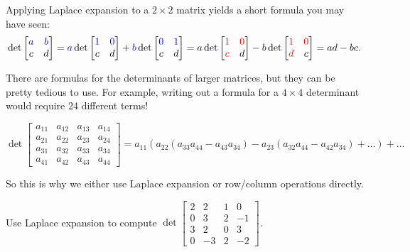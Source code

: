 \begin{observation}
Applying Laplace expansion to a \(2 \times 2\) matrix yields a short formula you may have seen:
\[
  \det \begin{bmatrix} \textcolor{blue}{a} & \textcolor{blue}{b} \\ c & d \end{bmatrix}
=
  \textcolor{blue}{a}\det \begin{bmatrix} \textcolor{blue}{1} & \textcolor{blue}{0} \\ 
    c & d \end{bmatrix} 
+ 
  \textcolor{blue}{b} \det \begin{bmatrix} \textcolor{blue}{0} & \textcolor{blue}{1} \\ 
    c & d \end{bmatrix} 
=
  a\det \begin{bmatrix} \textcolor{red}{1} & \textcolor{red}{0} \\ 
    \textcolor{red}{c} & d \end{bmatrix} 
-
  b \det \begin{bmatrix} \textcolor{red}{1} & \textcolor{red}{0} \\ 
    \textcolor{red}{d} & c \end{bmatrix} 
= 
  ad-bc
.\]

\vspace{1em}

There are formulas for the determinants of larger matrices,
but they can be pretty tedious to use. For example, writing out a
formula for a \(4\times 4\) determinant would require 24 different terms!

\[
   \det\begin{bmatrix}
     a_{11} & a_{12} & a_{13} & a_{14} \\
     a_{21} & a_{22} & a_{23} & a_{24} \\
     a_{31} & a_{32} & a_{33} & a_{34} \\
     a_{41} & a_{42} & a_{43} & a_{44}
   \end{bmatrix}
     =
   a_{11}(a_{22}(a_{33}a_{44}-a_{43}a_{34})-a_{23}(a_{32}a_{44}-a_{42}a_{34})+\dots)+\dots
\]

So this is why we either use Laplace expansion or row/column operations directly.
\end{observation}

\begin{activity}{10}
  Use Laplace expansion to compute 
  \(
    \det\begin{bmatrix} 
      2 & 2 & 1 & 0 \\ 
      0 & 3 & 2 & -1 \\ 
      3 & 2 & 0 & 3 \\ 
      0 & -3 & 2 & -2 
    \end{bmatrix}
  \).
\end{activity}


